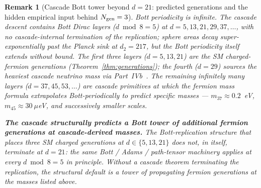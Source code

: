 \documentclass[12pt,a4paper]{article}
\newtheorem{remark}[theorem]{Remark}
\begin{document}
\begin{remark}[Cascade Bott tower beyond $d=21$: predicted generations and the hidden empirical input behind $N_{\rm gen}=3$]\label{rem:bott-tower-open}
Bott periodicity is infinite. The cascade descent contains Bott Dirac layers ($d \bmod 8 = 5$) at $d = 5, 13, 21, 29, 37, \ldots$, with no cascade-internal termination of the replication; sphere areas decay super-exponentially past the Planck sink at $d_2=217$, but the Bott periodicity itself extends without bound. The first three layers ($d=5,13,21$) are the SM charged-fermion generations (Theorem~\ref{thm:generations}); the fourth ($d=29$) sources the heaviest cascade neutrino mass via Part~IVb~\cite{part4b}. The remaining infinitely many layers ($d=37, 45, 53, \ldots$) are cascade primitives at which the fermion mass formula extrapolates Bott-periodically to predict specific masses --- $m_{37}\approx 0.2$~eV, $m_{45}\approx 30~\mu$eV, and successively smaller scales.

\medskip\noindent\textbf{The cascade structurally predicts a Bott tower of additional fermion generations at cascade-derived masses.} The Bott-replication structure that places three SM charged generations at $d\in\{5,13,21\}$ does not, in itself, terminate at $d=21$: the same Bott / Adams / path-tensor machinery applies at every $d \bmod 8 = 5$ in principle. Without a cascade theorem terminating the replication, the structural default is a tower of propagating fermion generations at the masses listed above.


\end{remark}
\end{document}
